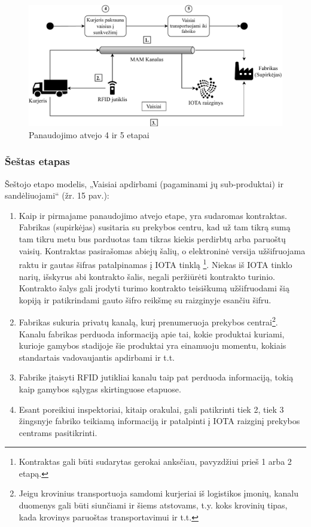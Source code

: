 \begin{figure}[H]
    \centering
    \includegraphics[scale=0.7]{images/iota-usecase-4-5}
    \caption{Panaudojimo atvejo 4 ir 5 etapai}
\end{figure}




\subsubsection{Šeštas etapas}

Šeštojo etapo modelis, „Vaisiai apdirbami (pagaminami jų sub-produktai) ir sandėliuojami“ (žr. 15 pav.):
\begin{enumerate}
    \item Kaip ir pirmajame panaudojimo atvejo etape, yra sudaromas kontraktas. Fabrikas (supirkėjas) susitaria su prekybos centru, kad už tam tikrą sumą tam tikru metu bus parduotas tam tikras kiekis perdirbtų arba paruoštų vaisių. Kontraktas pasirašomas abiejų šalių, o elektroninė versija užšifruojama raktu ir gautas šifras patalpinamas į IOTA tinklą \footnote{Kontraktas gali būti sudarytas gerokai anksčiau, pavyzdžiui prieš 1 arba 2 etapą.}. Niekas iš IOTA tinklo narių, išskyrus abi kontrakto šalis, negali peržiūrėti kontrakto turinio. Kontrakto šalys gali įrodyti turimo kontrakto teisiškumą užšifruodami šią kopiją ir patikrindami gauto šifro reikšmę su raizginyje esančiu šifru.
    \item Fabrikas sukuria privatų kanalą, kurį prenumeruoja prekybos centrai\footnote{Jeigu krovinius transportuoja samdomi kurjeriai iš logistikos įmonių, kanalu duomenys gali būti siunčiami ir šiems atstovams, t.y. koks krovinių tipas, kada krovinys paruoštas transportavimui ir t.t.}. Kanalu fabrikas perduoda informaciją apie tai, kokie produktai kuriami, kurioje gamybos stadijoje šie produktai yra einamuoju momentu, kokiais standartais vadovaujantis apdirbami ir t.t.
    \item Fabrike įtaisyti RFID jutikliai kanalu taip pat perduoda informaciją, tokią kaip gamybos sąlygas skirtinguose etapuose.
    \item Esant poreikiui inspektoriai, kitaip orakulai, gali patikrinti tiek 2, tiek 3 žingsnyje fabriko teikiamą informaciją ir patalpinti į IOTA raizginį prekybos centrams pasitikrinti.
\end{enumerate}

